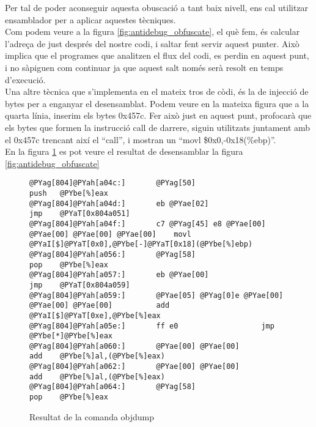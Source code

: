 Per tal de poder aconseguir aquesta obuscació a tant baix nivell, ens cal utilitzar ensamblador per a 
aplicar aquestes tècniques. \\

Com podem veure a la figura \ref{fig:antidebug_obfuscate}, el què fem, és calcular l'adreça de just 
després del nostre codi, i saltar fent servir aquest punter. Això implica que el programes que analitzen
el flux del codi, es perdin en aquest punt, i no sàpiguen com continuar ja que aquest salt només serà 
resolt en temps d'execució. \\

Una altre tècnica que s'implementa en el mateix tros de còdi, és la de injecció de bytes per a enganyar el
desensamblat. Podem veure en la mateixa figura que a la quarta línia, inserim els bytes 0x457c. Fer això
just en aquest punt, profocarà que els bytes que formen la instrucció call de darrere, siguin utilitzats
juntament amb el 0x457c trencant així el ``call'', i mostran un ``movl \$0x0,-0x18(\%ebp)''. \\

En la figura \ref{fig:antidebug_obfuscate2} es pot veure el resultat de desensamblar la figura \ref{fig:antidebug_obfuscate}

\begin{figure}[htp]
\begin{Verbatim}[commandchars=@\[\]]
@PYag[804]@PYah[a04c:]       @PYag[50]                      push   @PYbe[%]eax
@PYag[804]@PYah[a04d:]       eb @PYae[02]                   jmp    @PYaT[0x804a051]
@PYag[804]@PYah[a04f:]       c7 @PYag[45] e8 @PYae[00] @PYae[00] @PYae[00] @PYae[00]    movl   @PYaI[$]@PYaT[0x0],@PYbe[-]@PYaT[0x18](@PYbe[%]ebp)
@PYag[804]@PYah[a056:]       @PYag[58]                      pop    @PYbe[%]eax
@PYag[804]@PYah[a057:]       eb @PYae[00]                   jmp    @PYaT[0x804a059]
@PYag[804]@PYah[a059:]       @PYae[05] @PYag[0]e @PYae[00] @PYae[00] @PYae[00]          add    @PYaI[$]@PYaT[0xe],@PYbe[%]eax
@PYag[804]@PYah[a05e:]       ff e0                   jmp    @PYbe[*]@PYbe[%]eax
@PYag[804]@PYah[a060:]       @PYae[00] @PYae[00]                   add    @PYbe[%]al,(@PYbe[%]eax)
@PYag[804]@PYah[a062:]       @PYae[00] @PYae[00]                   add    @PYbe[%]al,(@PYbe[%]eax)
@PYag[804]@PYah[a064:]       @PYag[58]                      pop    @PYbe[%]eax
\end{Verbatim}
	\caption{Resultat de la comanda objdump}
	\label{fig:antidebug_obfuscate2}
\end{figure}

